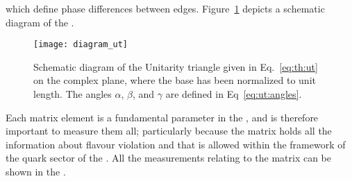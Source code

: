 which define phase differences between edges.
Figure~\ref{fig:th:ut} depicts a schematic diagram of the \ut.

\begin{figure}
  \begin{center}
      \texttt{[image: diagram\_ut]}
  \end{center}
  \caption[Schematic diagram of the Unitarity Triangle]
  {
    Schematic diagram of the Unitarity triangle given in Eq.~\protect\ref{eq:th:ut} on the complex
    plane, where the base has been normalized to unit length.
    The angles $\alpha$, $\beta$, and $\gamma$ are defined in Eq~\protect\ref{eq:ut:angles}.
  }
  \label{fig:th:ut}
\end{figure}



Each \ckm matrix element is a fundamental parameter in the \sm, and is therefore important to
measure them all; particularly because the \ckm matrix holds all
the information about flavour violation and \CPV that is allowed within the
framework of the quark sector of the \sm.
All the measurements relating to the \ckm matrix can be shown in the \ut.

